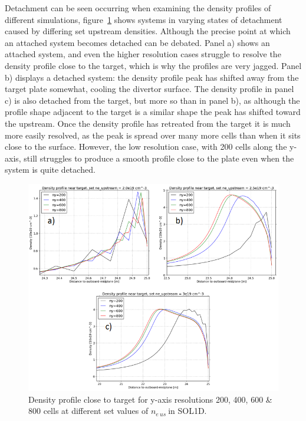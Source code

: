 \documentclass[11pt]{article}  %
\providecommand{\neus}{$n_{e~us}~$} %
\begin{document}
Detachment can be seen occurring when examining the density profiles of different simulations, figure~\ref{figneprofneusALLtriang} shows systems in varying states of detachment caused by differing set upstream densities. Although the precise point at which an attached system becomes detached can be debated. Panel a) shows an attached system, and even the higher resolution cases struggle to resolve the density profile close to the target, which is why the profiles are very jagged. Panel b) displays a detached system: the density profile peak has shifted away from the target plate somewhat, cooling the divertor surface. The density profile in panel c) is also detached from the target, but more so than in panel b), as although the profile shape adjacent to the target is a similar shape the peak has shifted toward the upstream. Once the density profile has retreated from the target it is much more easily resolved, as the peak is spread over many more cells than when it sits close to the surface. However, the low resolution case, with 200 cells along the y-axis, still struggles to produce a smooth profile close to the plate even when the system is quite detached. 

\begin{figure}
\includegraphics[scale=0.5]{Figures/sol1d/neprofneusALLtriang.png}
\centering
\caption{Density profile close to target for y-axis resolutions 200, 400, 600 \& 800 cells at different set values of \neus in SOL1D.}\label{figneprofneusALLtriang}
\end{figure}
\end{document}
